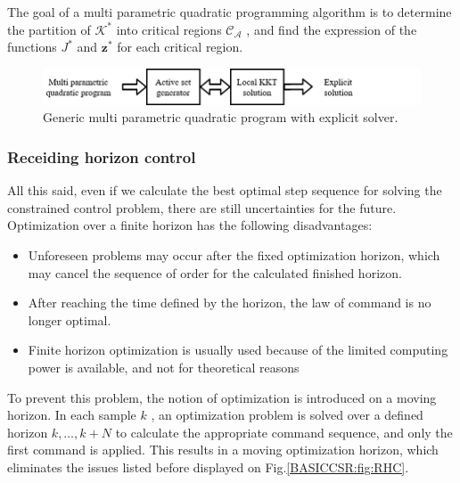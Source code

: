     The goal of a multi parametric quadratic programming algorithm is to determine the partition of $\mathcal{K}^*$ into critical regions $\mathcal{C}_{\mathcal{A}}$ , and find the expression of the functions $J^*$ and $\textbf{z}^*$ for each critical region. 
    
    \begin{figure}[!ht]
        \centering
        \includegraphics[width=.7\textwidth]{EMPC_PNG_Pics/MPQPAlgo.png}
        \caption{Generic multi parametric quadratic program with explicit solver.}
        \label{EMPC:fig:ControlStruct}
    \end{figure}




    \subsubsection{Receiding horizon control}\label{BASICCSR:sec:RHC}

    All this said, even if we calculate the best optimal step sequence for solving the constrained control problem, there are still uncertainties for the future. Optimization over a finite horizon has the following disadvantages:
		
		\begin{itemize}
			\item Unforeseen problems may occur after the fixed optimization horizon, which may cancel the sequence of order for the 		calculated finished horizon.
		\item After reaching the time defined by the horizon, the law of command is no longer optimal.
		\item Finite horizon optimization is usually used because of the limited computing power is available, and not for theoretical reasons
		\end{itemize}
		
		To prevent this problem, the notion of optimization is introduced on a moving horizon. In each sample $k$ , an optimization problem is solved over a defined horizon $k,\dots,k+N$ to calculate the appropriate command sequence, and only the first command is applied. This results in a moving optimization horizon, which eliminates the issues listed before displayed on Fig.\ref{BASICCSR:fig:RHC}. \\

